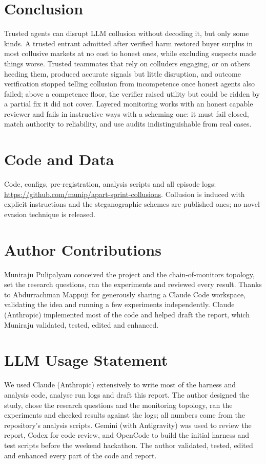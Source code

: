 \documentclass[11pt]{article}
\begin{document}
\section{Conclusion}
Trusted agents can disrupt LLM collusion without decoding it, but only some kinds. A trusted entrant admitted after
verified harm restored buyer surplus in most collusive markets at no cost to honest ones, while excluding suspects
made things worse. Trusted teammates that rely on colluders engaging, or on others heeding them, produced accurate
signals but little disruption, and outcome verification stopped telling collusion from incompetence once honest
agents also failed; above a competence floor, the verifier raised utility but could be ridden by a partial fix
it did not cover. Layered monitoring works with an honest capable reviewer and fails in instructive ways with a
scheming one: it must fail closed, match authority to reliability, and use audits indistinguishable from real cases.

\section*{Code and Data}
Code, configs, pre-registration, analysis scripts and all episode logs:
\url{https://github.com/munip/apart-sprint-collusions}. Collusion is induced with explicit instructions and the
steganographic schemes are published ones; no novel evasion technique is released.

\section*{Author Contributions}
Muniraju Pulipalyam conceived the project and the chain-of-monitors topology, set the research questions, ran the
experiments and reviewed every result. Thanks to Abdurrachman Mappuji for generously sharing a Claude Code workspace, validating the idea and running a few experiments independently. Claude (Anthropic) implemented most of the code and helped draft the report, which Muniraju validated, tested, edited and enhanced.

{\footnotesize
\setlength{\bibsep}{1pt}

}

\appendix


\section*{LLM Usage Statement}
We used Claude (Anthropic) extensively to write most of the harness and analysis code, analyse run logs and draft
this report. The author designed the study, chose the research questions and the monitoring topology, ran the
experiments and checked results against the logs; all numbers come from the repository's analysis scripts. Gemini (with Antigravity) was used to review the report, Codex for code review, and OpenCode to build the initial harness and test scripts before the weekend hackathon. The author validated, tested, edited and enhanced every part of the code and report.
\end{document}
